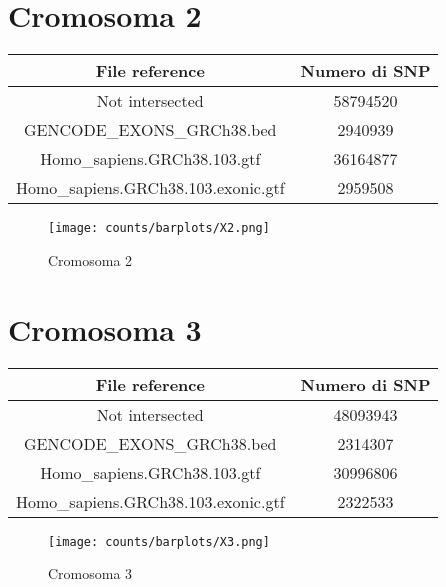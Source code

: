 \section*{Cromosoma 2}
  \begin{table}[H]\centering
	\begin{tabular}{|c|c|}
	  \hline
	  File reference & Numero di SNP \\
		\hline
		Not intersected & 58794520 \\
	  \hline
	  GENCODE\_EXONS\_GRCh38.bed & 2940939 \\
	  \hline
	  Homo\_sapiens.GRCh38.103.gtf & 36164877 \\
	  \hline
	  Homo\_sapiens.GRCh38.103.exonic.gtf & 2959508 \\
	  \hline
	\end{tabular}
  \end{table}
  \begin{figure}[H]
	\texttt{[image: counts/barplots/X2.png]}
	\caption{Cromosoma 2}
	\label{fig:chr2}
  \end{figure}

\section*{Cromosoma 3}
  \begin{table}[H]\centering
	\begin{tabular}{|c|c|}
	  \hline
	  File reference & Numero di SNP \\
		\hline
		Not intersected & 48093943 \\
	  \hline
	  GENCODE\_EXONS\_GRCh38.bed & 2314307 \\
	  \hline
	  Homo\_sapiens.GRCh38.103.gtf & 30996806 \\
	  \hline
	  Homo\_sapiens.GRCh38.103.exonic.gtf & 2322533 \\
	  \hline
	\end{tabular}
  \end{table}
  \begin{figure}[H]
	\texttt{[image: counts/barplots/X3.png]}
	\caption{Cromosoma 3}
	\label{fig:chr3}
  \end{figure}

